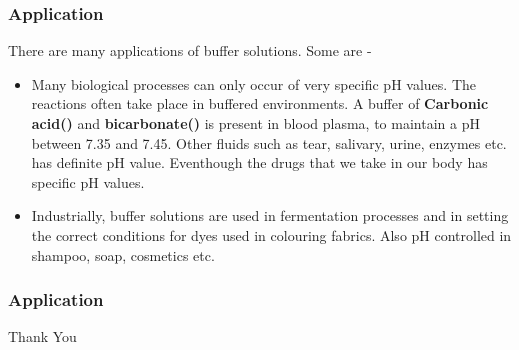\documentclass{beamer}
\begin{document}
\begin{frame}
  \frametitle{Application}
  There are many applications of buffer solutions. Some are - 
  \begin{itemize}
    \item Many biological processes can only occur of very specific pH values. The reactions often take place in buffered environments. A buffer of \textbf{Carbonic acid()} and \textbf{bicarbonate()} is present in blood plasma, to maintain a pH between 7.35 and 7.45. Other fluids such as tear, salivary, urine, enzymes etc. has definite pH value. Eventhough the drugs that we take in our body has specific pH values.
    \item Industrially, buffer solutions are used in fermentation processes and in setting the correct conditions for dyes used in colouring fabrics. Also pH controlled in shampoo, soap, cosmetics etc.
  \end{itemize}
\end{frame}

\begin{frame}
  \frametitle{Application}

  \begin{figure}
     \qquad

  \end{figure}
\end{frame}

\begin{frame}
  \begin{center}
  \Huge{Thank You}
  \end{center}
\end{frame}
\end{document}
